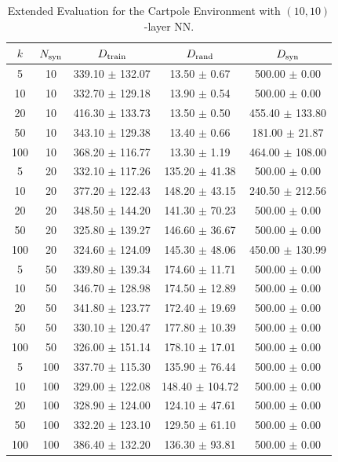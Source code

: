 \begin{table}[h!]
\centering
\caption{Extended Evaluation for the Cartpole Environment with $(10,10)$-layer NN.}
\begin{tabular}{ccccc}
\hline
$k$ & $N_{\textnormal{syn}}$ & $D_{\textnormal{train}}$ & $D_{\textnormal{rand}}$ & $D_{\textnormal{syn}}$ \\ \hline
5 & 10 & 339.10 $\pm$ 132.07 & 13.50 $\pm$ 0.67 & 500.00 $\pm$ 0.00 \\ 
10 & 10 & 332.70 $\pm$ 129.18 & 13.90 $\pm$ 0.54 & 500.00 $\pm$ 0.00 \\ 
20 & 10 & 416.30 $\pm$ 133.73 & 13.50 $\pm$ 0.50 & 455.40 $\pm$ 133.80 \\ 
50 & 10 & 343.10 $\pm$ 129.38 & 13.40 $\pm$ 0.66 & 181.00 $\pm$ 21.87 \\ 
100 & 10 & 368.20 $\pm$ 116.77 & 13.30 $\pm$ 1.19 & 464.00 $\pm$ 108.00 \\ \hline
5 & 20 & 332.10 $\pm$ 117.26 & 135.20 $\pm$ 41.38 & 500.00 $\pm$ 0.00 \\
10 & 20 & 377.20 $\pm$ 122.43 & 148.20 $\pm$ 43.15 & 240.50 $\pm$ 212.56 \\ 
20 & 20 & 348.50 $\pm$ 144.20 & 141.30 $\pm$ 70.23 & 500.00 $\pm$ 0.00 \\ 
50 & 20 & 325.80 $\pm$ 139.27 & 146.60 $\pm$ 36.67 & 500.00 $\pm$ 0.00 \\
100 & 20 & 324.60 $\pm$ 124.09 & 145.30 $\pm$ 48.06 & 450.00 $\pm$ 130.99 \\ \hline
5 & 50 & 339.80 $\pm$ 139.34 & 174.60 $\pm$ 11.71 & 500.00 $\pm$ 0.00 \\ 
10 & 50 & 346.70 $\pm$ 128.98 & 174.50 $\pm$ 12.89 & 500.00 $\pm$ 0.00 \\ 
20 & 50 & 341.80 $\pm$ 123.77 & 172.40 $\pm$ 19.69 & 500.00 $\pm$ 0.00 \\ 
50 & 50 & 330.10 $\pm$ 120.47 & 177.80 $\pm$ 10.39 & 500.00 $\pm$ 0.00 \\ 
100 & 50 & 326.00 $\pm$ 151.14 & 178.10 $\pm$ 17.01 & 500.00 $\pm$ 0.00 \\ \hline
5 & 100 & 337.70 $\pm$ 115.30 & 135.90 $\pm$ 76.44 & 500.00 $\pm$ 0.00 \\ 
10 & 100 & 329.00 $\pm$ 122.08 & 148.40 $\pm$ 104.72 & 500.00 $\pm$ 0.00 \\ 
20 & 100 & 328.90 $\pm$ 124.00 & 124.10 $\pm$ 47.61 & 500.00 $\pm$ 0.00 \\ 
50 & 100 & 332.20 $\pm$ 123.10 & 129.50 $\pm$ 61.10 & 500.00 $\pm$ 0.00 \\ 
100 & 100 & 386.40 $\pm$ 132.20 & 136.30 $\pm$ 93.81 & 500.00 $\pm$ 0.00 \\ \hline

\end{tabular}
\end{table}
